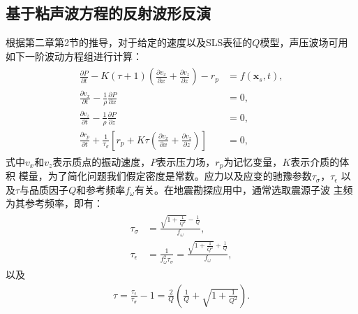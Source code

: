 \subsection{基于粘声波方程的反射波形反演}
\vspace{0.9cm}
根据第二章第2节的推导，对于给定的速度以及SLS表征的$Q$模型，声压波场可用如下一阶波动方程组进行计算：
     \begin{eqnarray}
        \begin{aligned}
        \frac{\partial P}{\partial t} -
        K(\tau+1)(\frac{\partial v_x}{\partial x}
        +\frac{\partial v_z}{\partial z})-r_p &=f(\mathbf{x}_s,t),
        \\
        \frac{\partial v_x}{\partial t} - \frac{1}{\rho}\frac{\partial P}{\partial x}
        &=0,\\
        \frac{\partial v_z}{\partial t} - \frac{1}{\rho}\frac{\partial P}{\partial z}&=0,\\
        \frac{\partial{r_p}}{\partial t} +
        \frac{1}{\tau_\sigma}\left[r_p+K\tau(\frac{\partial
        v_x}{\partial x}+\frac{\partial v_z}{\partial z})\right]&=0,
        \end{aligned}
        \label{eq:viscoacoustic}
    \end{eqnarray}
式中$v_x$和$v_z$表示质点的振动速度，$P$表示压力场，$r_p$为记忆变量，$K$表示介质的体积
模量，为了简化问题我们假定密度是常数。应力以及应变的驰豫参数$\tau_\sigma$，$\tau_\epsilon$
以及$\tau$与品质因子$Q$和参考频率$f_\omega$有关。在地震勘探应用中，通常选取震源子波
主频为其参考频率，即有：
    \begin{eqnarray}
        \begin{aligned}
            \tau_\sigma &= \frac{\sqrt{1+\frac{1}{Q^2}}-\frac{1}{Q}}{f_\omega},\\
            \tau_\epsilon &= \frac{1}{f^2_\omega\tau_\sigma}=\frac{\sqrt{1+\frac{1}{Q^2}}+\frac{1}{Q}}{f_\omega},
        \end{aligned}
    \end{eqnarray}
以及
    \begin{eqnarray}
        \tau=\frac{\tau_\epsilon}{\tau_\sigma}-1=\frac{2}{Q}(\frac{1}{Q}+\sqrt{1+\frac{1}{Q^2}}).
        \label{eq:tq}
    \end{eqnarray}

